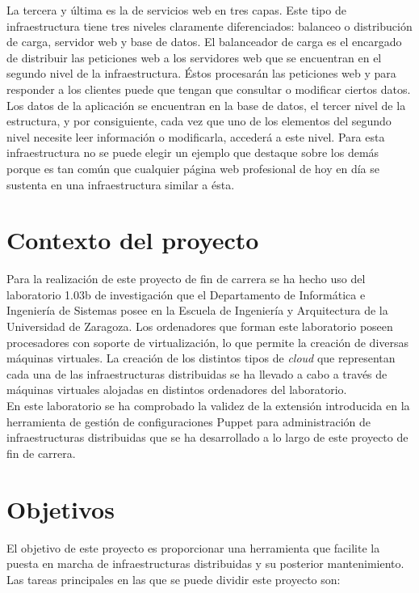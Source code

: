 La tercera y última es la de servicios web en tres capas. Este tipo de infraestructura tiene tres niveles claramente diferenciados: balanceo o distribución de carga, servidor web y base de datos. El balanceador de carga es el encargado de distribuir las peticiones web a los servidores web que se encuentran en el segundo nivel de la infraestructura. Éstos procesarán las peticiones web y para responder a los clientes puede que tengan que consultar o modificar ciertos datos. Los datos de la aplicación se encuentran en la base de datos, el tercer nivel de la estructura, y por consiguiente, cada vez que uno de los elementos del segundo nivel necesite leer información o modificarla, accederá a este nivel. Para esta infraestructura no se puede elegir un ejemplo que destaque sobre los demás porque es tan común que cualquier página web profesional de hoy en día se sustenta en una infraestructura similar a ésta.\\


\section{Contexto del proyecto}

Para la realización de este proyecto de fin de carrera se ha hecho uso del laboratorio 1.03b de investigación que el Departamento de Informática e Ingeniería de Sistemas posee en la Escuela de Ingeniería y Arquitectura de la Universidad de Zaragoza. Los ordenadores que forman este laboratorio poseen procesadores con soporte de virtualización, lo que permite la creación de diversas máquinas virtuales. La creación de los distintos tipos de \emph{cloud} que representan cada una de las infraestructuras distribuidas se ha llevado a cabo a través de máquinas virtuales alojadas en distintos ordenadores del laboratorio.\\

En este laboratorio se ha comprobado la validez de la extensión introducida en la herramienta de gestión de configuraciones Puppet para administración de infraestructuras distribuidas que se ha desarrollado a lo largo de este proyecto de fin de carrera.


\section{Objetivos}

El objetivo de este proyecto es proporcionar una herramienta que facilite la puesta en marcha de infraestructuras distribuidas y su posterior mantenimiento. Las tareas principales en las que se puede dividir este proyecto son:

